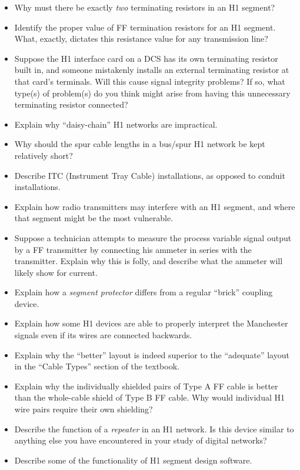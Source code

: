 \begin{itemize}
\item{} Why must there be exactly {\it two} terminating resistors in an H1 segment?
\item{} Identify the proper value of FF termination resistors for an H1 segment.  What, exactly, dictates this resistance value for any transmission line?
\item{} Suppose the H1 interface card on a DCS has its own terminating resistor built in, and someone mistakenly installs an external terminating resistor at that card's terminals.  Will this cause signal integrity problems?  If so, what type(s) of problem(s) do you think might arise from having this unnecessary terminating resistor connected?
\item{} Explain why ``daisy-chain'' H1 networks are impractical.
\item{} Why should the spur cable lengths in a bus/spur H1 network be kept relatively short?
\item{} Describe ITC (Instrument Tray Cable) installations, as opposed to conduit installations.
\item{} Explain how radio transmitters may interfere with an H1 segment, and where that segment might be the most vulnerable.
\item{} Suppose a technician attempts to measure the process variable signal output by a FF transmitter by connecting his ammeter in series with the transmitter.  Explain why this is folly, and describe what the ammeter will likely show for current.
\item{} Explain how a {\it segment protector} differs from a regular ``brick'' coupling device.
\item{} Explain how some H1 devices are able to properly interpret the Manchester signals even if its wires are connected backwards.
\item{} Explain why the ``better'' layout is indeed superior to the ``adequate'' layout in the ``Cable Types'' section of the textbook.
\item{} Explain why the individually shielded pairs of Type A FF cable is better than the whole-cable shield of Type B FF cable.  Why would individual H1 wire pairs require their own shielding?
\item{} Describe the function of a {\it repeater} in an H1 network.  Is this device similar to anything else you have encountered in your study of digital networks?
\item{} Describe some of the functionality of H1 segment design software.
\end{itemize}












